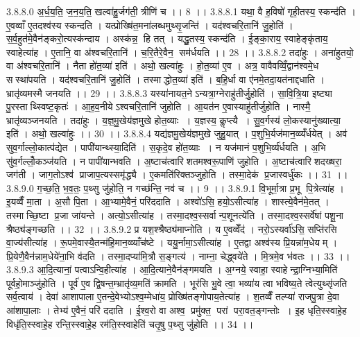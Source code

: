 3.8.8.0
अ॒र्ध॒य॒ति॒ ज॒न॒य॒ति॒ खल्वा॑हु॒र्जग॑ती॒ त्रीणि॑ च ।। 8 ।।
3.8.8.1
यथा॒ वै ह॒विषो॑ गृही॒तस्य॒ स्कन्द॑ति । ए॒वव्वाँ ए॒तदश्व॑स्य स्कन्दति । यत्प्रोख्षि॑त॒मना॑लब्धमुथ्सृ॒जन्ति॑ । यद॑श्वचरि॒तानि॑ जु॒होति॑ । स॒र्व॒हुत॑मे॒वैन॑ङ्करो॒त्यस्क॑न्दाय । अस्क॑न्न॒॒ हि तत् । यद्धु॒तस्य॒ स्कन्द॑ति । ई॒ङ्का॒राय॒ स्वाहेङ्कृ॑ताय॒ स्वाहेत्या॑ह । ए॒तानि॒ वा अ॑श्वचरि॒तानि॑ । च॒रि॒तैरे॒वैन॒॒ सम॑र्धयति ।। 28 ।।
3.8.8.2
तदा॑हुः । अना॑हुतयो॒ वा अ॑श्वचरि॒तानि॑ । नैता हो॑त॒व्या॑ इति॑ । अथो॒ खल्वा॑हुः । हो॒त॒व्या॑ ए॒व । अत्र॒ वावैवव्विँ॒द्वान॑श्वमे॒ध सस्था॑पयति । यद॑श्वचरि॒तानि॑ जु॒होति॑ । तस्माद्धोत॒व्या॑ इति॑ । ब॒हि॒र्धा वा ए॑नमे॒तदा॒यत॑नाद्दधाति । भ्रातृ॑व्यमस्मै जनयति ।। 29 ।।
3.8.8.3
यस्या॑नायत॒नेऽन्यत्रा॒ग्नेराहु॑तीर्जु॒होति॑ । सा॒वि॒त्रि॒या इष्ट्या पु॒रस्ताथ्स्विष्ट॒कृतः॑ । आ॒ह॒व॒नीयेऽश्वचरि॒तानि॑ जुहोति । आ॒यत॑न ए॒वास्याहु॑तीर्जुहोति । नास्मै॒ भ्रातृ॑व्यञ्जनयति । तदा॑हुः । य॒ज्ञ॒मु॒खेय॑ज्ञमुखे होत॒व्याः । य॒ज्ञस्य॒ कॢप्त्यै । सु॒व॒र्गस्य॑ लो॒कस्यानु॑ख्यात्या॒ इति॑ । अथो॒ खल्वा॑हुः ।। 30 ।।
3.8.8.4
यद्य॑ज्ञमु॒खेय॑ज्ञमुखे जुहु॒यात् । प॒शुभि॒र्यज॑मान॒व्व्यँ॑र्धयेत् । अव॑ सुव॒र्गाल्लो॒कात्प॑द्येत । पापी॑यान्थ्स्या॒दिति॑ । स॒कृदे॒व हो॑त॒व्याः । न यज॑मानं प॒शुभि॒र्व्य॑र्धयति । अ॒भि सु॑व॒र्गल्लोँ॒कञ्ज॑यति । न पापी॑यान्भवति । अ॒ष्टाच॑त्वारिशतमश्वरू॒पाणि॑ जुहोति । अ॒ष्टाच॑त्वारिशदख्षरा॒ जग॑ती । जाग॒तोऽश्व॑ प्राजाप॒त्यस्समृ॑द्ध्यै । ए॒कमति॑रिक्तञ्जुहोति । तस्मा॒देक॑ प्र॒जास्वर्धु॑कः ।। 31 ।।
3.8.9.0
ग॒च्छ॒ति॒ भ॒व॒तः॒ प॒थ्सु जु॑होति॒ न गच्छ॑न्ति॒ नव॑ च ।। 9 ।।
3.8.9.1
वि॒भूर्मा॒त्रा प्र॒भू पि॒त्रेत्या॑ह । इ॒यव्वैँ मा॒ता । अ॒सौ पि॒ता । आ॒भ्यामे॒वैनं॒ परि॑ददाति । अश्वो॑ऽसि॒ हयो॒ऽसीत्या॑ह । शास्त्ये॒वैन॑मे॒तत् । तस्माच्छि॒ष्टा प्र॒जा जा॑यन्ते । अत्यो॒ऽसीत्या॑ह । तस्मा॒दश्व॒स्सर्वान्प॒शूनत्ये॑ति । तस्मा॒दश्व॒स्सर्वे॑षां पशू॒ना श्रैष्ठ्य॑ङ्गच्छति ।। 32 ।।
3.8.9.2
प्र यश॒श्श्रैष्ठ्य॑माप्नोति । य ए॒वव्वेँद॑ । नरो॒ऽस्यर्वा॑ऽसि॒ सप्ति॑रसि वा॒ज्य॑सीत्या॑ह । रू॒पमे॒वास्यै॒तन्म॑हि॒मान॒व्व्याँच॑ष्टे । ययु॒र्नामा॒ऽसीत्या॑ह । ए॒तद्वा अश्व॑स्य प्रि॒यन्ना॑म॒धेयम् । प्रि॒येणै॒वैन॑न्नाम॒धेये॑ना॒भि व॑दति । तस्मा॒दप्या॑मि॒त्रौ स॒ङ्गत्य॑ । नाम्ना॒ चेद्ध्वये॑ते । मि॒त्रमे॒व भ॑वतः ।। 33 ।।
3.8.9.3
आ॒दि॒त्यानां॒ पत्वाऽन्वि॒हीत्या॑ह । आ॒दि॒त्याने॒वैन॑ङ्गमयति । अ॒ग्नये॒ स्वाहा॒ स्वाहेन्द्रा॒ग्निभ्या॒मिति॑ पूर्वहो॒माञ्जु॑होति । पूर्व॑ ए॒व द्वि॒षन्त॒म्भ्रातृ॑व्य॒मति॑ क्रामति । भूर॑सि भु॒वे त्वा॒ भव्या॑य त्वा भविष्य॒ते त्वेत्युथ्सृ॑जति सर्व॒त्वाय॑ । देवा॑ आशापाला ए॒तन्दे॒वेभ्योऽश्व॒म्मेधा॑य॒ प्रोख्षि॑तङ्गोपाय॒तेत्या॑ह । श॒तव्वैँ तल्प्या॑ राजपु॒त्रा दे॒वा आ॑शापा॒लाः । तेभ्य॑ ए॒वैनं॒ परि॑ ददाति । ई॒श्व॒रो वा अश्व॒ प्रमु॑क्त॒ परां परा॒वत॒ङ्गन्तोः । इ॒ह धृति॒स्स्वाहे॒ह विधृ॑ति॒स्स्वाहे॒ह रन्ति॒स्स्वाहे॒ह रम॑ति॒स्स्वाहेति॑ चतृ॒षु प॒थ्सु जु॑होति ।। 34 ।।
